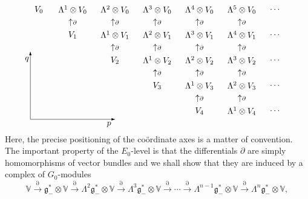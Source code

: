 \documentclass[pdftex]{sigma}
\begin{document}
\begin{equation}\label{E0}\raisebox{-70pt}{\begin{picture}(300,148)(0,10)
\put(0,20){\vector(1,0){100}}
\put(0,20){\vector(0,1){80}}
\put(93,14){\makebox(0,0){$p$}}
\put(-4,91){\makebox(0,0){$q$}}
\put(10,150){\makebox(0,0){$V_0$}}
\put(50,150){\makebox(0,0){$\Lambda^1\otimes V_0$}}
\put(100,150){\makebox(0,0){$\Lambda^2\otimes V_0$}}
\put(150,150){\makebox(0,0){$\Lambda^3\otimes V_0$}}
\put(200,150){\makebox(0,0){$\Lambda^4\otimes V_0$}}
\put(250,150){\makebox(0,0){$\Lambda^5\otimes V_0$}}
\put(290,150){\makebox(0,0){$\cdots$}}
\put(290,120){\makebox(0,0){$\cdots$}}
\put(290,90){\makebox(0,0){$\cdots$}}
\put(290,60){\makebox(0,0){$\cdots$}}
\put(290,30){\makebox(0,0){$\cdots$}}
\put(50,135){\makebox(0,0){$\uparrow\scriptstyle\partial$}}
\put(100,135){\makebox(0,0){$\uparrow\scriptstyle\partial$}}
\put(150,135){\makebox(0,0){$\uparrow\scriptstyle\partial$}}
\put(200,135){\makebox(0,0){$\uparrow\scriptstyle\partial$}}
\put(250,135){\makebox(0,0){$\uparrow\scriptstyle\partial$}}
\put(50,120){\makebox(0,0){$V_1$}}
\put(100,120){\makebox(0,0){$\Lambda^1\otimes V_1$}}
\put(150,120){\makebox(0,0){$\Lambda^2\otimes V_1$}}
\put(200,120){\makebox(0,0){$\Lambda^3\otimes V_1$}}
\put(250,120){\makebox(0,0){$\Lambda^4\otimes V_1$}}
\put(100,105){\makebox(0,0){$\uparrow\scriptstyle\partial$}}
\put(150,105){\makebox(0,0){$\uparrow\scriptstyle\partial$}}
\put(200,105){\makebox(0,0){$\uparrow\scriptstyle\partial$}}
\put(250,105){\makebox(0,0){$\uparrow\scriptstyle\partial$}}
\put(100,90){\makebox(0,0){$V_2$}}
\put(150,90){\makebox(0,0){$\Lambda^1\otimes V_2$}}
\put(200,90){\makebox(0,0){$\Lambda^2\otimes V_2$}}
\put(250,90){\makebox(0,0){$\Lambda^3\otimes V_2$}}
\put(150,75){\makebox(0,0){$\uparrow\scriptstyle\partial$}}
\put(200,75){\makebox(0,0){$\uparrow\scriptstyle\partial$}}
\put(250,75){\makebox(0,0){$\uparrow\scriptstyle\partial$}}
\put(150,60){\makebox(0,0){$V_3$}}
\put(200,60){\makebox(0,0){$\Lambda^1\otimes V_3$}}
\put(250,60){\makebox(0,0){$\Lambda^2\otimes V_3$}}
\put(200,45){\makebox(0,0){$\uparrow\scriptstyle\partial$}}
\put(250,45){\makebox(0,0){$\uparrow\scriptstyle\partial$}}
\put(200,30){\makebox(0,0){$V_4$}}
\put(250,30){\makebox(0,0){$\Lambda^1\otimes V_4$}}
\end{picture}}\end{equation}
Here, the precise positioning of the co\"ordinate axes is a matter of
convention. The important property of the $E_0$-level is that the
dif\/ferentials $\partial$ are simply homomorphisms of vector bundles and we
shall show that they are induced by a complex of $G_0$-modules
\[{\mathbb{V}}\stackrel{\partial}{\longrightarrow}
{\mathfrak{g}}_-^*\otimes{\mathbb{V}}\stackrel{\partial}{\longrightarrow}
\Lambda^2{\mathfrak{g}}_-^*\otimes{\mathbb{V}}
\stackrel{\partial}{\longrightarrow}
\Lambda^3{\mathfrak{g}}_-^*\otimes{\mathbb{V}}
\stackrel{\partial}{\longrightarrow}\cdots\stackrel{\partial}{\longrightarrow}
\Lambda^{n-1}{\mathfrak{g}}_-^*\otimes{\mathbb{V}}
\stackrel{\partial}{\longrightarrow}
\Lambda^n{\mathfrak{g}}_-^*\otimes{\mathbb{V}},\]
\newpage
\end{document}
